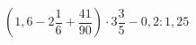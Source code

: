 \begin{ex}[type=calculate]
	\begin{condition}
		\( \left( 1,6-2\dfrac{1}{6}+\dfrac{41}{90} \right)\cdot3\dfrac{3}{5}-0,2:1,25 \)
	\end{condition}
	\answer{}
\end{ex}